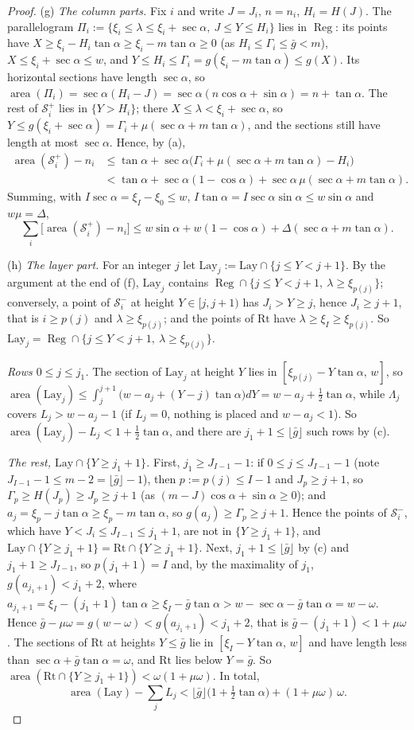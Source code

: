 \documentclass[11pt]{amsart}
\newcommand{\Reg}{\operatorname{Reg}}
\newcommand{\ca}{\cos\alpha}
\newcommand{\sa}{\sin\alpha}
\newcommand{\ta}{\tan\alpha}
\newcommand{\se}{\sec\alpha}
\theoremstyle{definition}
\theoremstyle{remark}
\numberwithin{equation}{section}
\begin{document}
\begin{proof}
(g) \emph{The column parts.} Fix $i$ and write $J=J_i$, $n=n_i$, $H_i=H(J)$. The parallelogram
$\Pi_i:=\{\xi_i\le\lambda\le\xi_i+\se,\ J\le Y\le H_i\}$ lies in $\Reg$: its points have
$X\ge\xi_i-H_i\ta\ge\xi_i-m\ta\ge0$ (as $H_i\le\Gamma_i\le\bar g<m$), $X\le\xi_i+\se\le w$, and
$Y\le H_i\le\Gamma_i=g(\xi_i-m\ta)\le g(X)$. Its horizontal sections have length $\se$, so
$\operatorname{area}(\Pi_i)=\se(H_i-J)=\se(n\ca+\sa)=n+\ta$. The rest of $\mathcal S_i^+$ lies in $\{Y>H_i\}$; there
$X\le\lambda<\xi_i+\se$, so $Y\le g(\xi_i+\se)=\Gamma_i+\mu(\se+m\ta)$, and the sections still have length at most
$\se$. Hence, by (a),
\begin{align*}
\operatorname{area}(\mathcal S_i^+)-n_i&\le\ta+\se\bigl(\Gamma_i+\mu(\se+m\ta)-H_i\bigr)\\
&<\ta+\se(1-\ca)+\se\,\mu(\se+m\ta).
\end{align*}
Summing, with $I\se=\xi_I-\xi_0\le w$, $I\ta=I\se\sa\le w\sa$ and $w\mu=\Delta$,
\[
\sum_i\bigl[\operatorname{area}(\mathcal S_i^+)-n_i\bigr]\le w\sa+w(1-\ca)+\Delta(\se+m\ta).
\]

(h) \emph{The layer part.} For an integer $j$ let $\mathrm{Lay}_j:=\mathrm{Lay}\cap\{j\le Y<j+1\}$. By the argument at the
end of (f), $\mathrm{Lay}_j$ contains $\Reg\cap\{j\le Y<j+1,\ \lambda\ge\xi_{p(j)}\}$; conversely, a point of
$\mathcal S_i^-$ at height $Y\in[j,j+1)$ has $J_i>Y\ge j$, hence $J_i\ge j+1$, that is $i\ge p(j)$ and
$\lambda\ge\xi_{p(j)}$; and the points of $\mathrm{Rt}$ have $\lambda\ge\xi_I\ge\xi_{p(j)}$. So $\mathrm{Lay}_j=\Reg\cap\{j\le Y<j+1,\ \lambda\ge\xi_{p(j)}\}$.

\emph{Rows $0\le j\le j_1$.} The section of $\mathrm{Lay}_j$ at height $Y$ lies in $[\xi_{p(j)}-Y\ta,\,w]$, so
$\operatorname{area}(\mathrm{Lay}_j)\le\int_j^{j+1}\bigl(w-a_j+(Y-j)\ta\bigr)dY=w-a_j+\frac12\ta$, while $\Lambda_j$
covers $L_j>w-a_j-1$ (if $L_j=0$, nothing is placed and $w-a_j<1$). So
$\operatorname{area}(\mathrm{Lay}_j)-L_j<1+\frac12\ta$, and there are $j_1+1\le\lfloor\bar g\rfloor$ such rows by (c).

\emph{The rest, $\mathrm{Lay}\cap\{Y\ge j_1+1\}$.} First, $j_1\ge J_{I-1}-1$: if $0\le j\le J_{I-1}-1$ (note
$J_{I-1}-1\le m-2=\lfloor\bar g\rfloor-1$), then $p:=p(j)\le I-1$ and $J_p\ge j+1$, so
$\Gamma_p\ge H(J_p)\ge J_p\ge j+1$ (as $(m-J)\ca+\sa\ge0$); and $a_j=\xi_p-j\ta\ge\xi_p-m\ta$, so
$g(a_j)\ge\Gamma_p\ge j+1$. Hence the points of $\mathcal S_i^-$, which have $Y<J_i\le J_{I-1}\le j_1+1$, are not in
$\{Y\ge j_1+1\}$, and $\mathrm{Lay}\cap\{Y\ge j_1+1\}=\mathrm{Rt}\cap\{Y\ge j_1+1\}$. Next, $j_1+1\le\lfloor\bar g\rfloor$
by (c) and $j_1+1\ge J_{I-1}$, so $p(j_1+1)=I$ and, by the maximality of $j_1$, $g(a_{j_1+1})<j_1+2$, where
$a_{j_1+1}=\xi_I-(j_1+1)\ta\ge\xi_I-\bar g\ta>w-\se-\bar g\ta=w-\omega$. Hence
$\bar g-\mu\omega=g(w-\omega)<g(a_{j_1+1})<j_1+2$, that is $\bar g-(j_1+1)<1+\mu\omega$. The sections of $\mathrm{Rt}$
at heights $Y\le\bar g$ lie in $[\xi_I-Y\ta,\,w]$ and have length less than $\se+\bar g\ta=\omega$, and $\mathrm{Rt}$
lies below $Y=\bar g$. So $\operatorname{area}(\mathrm{Rt}\cap\{Y\ge j_1+1\})<\omega(1+\mu\omega)$. In total,
\[
\operatorname{area}(\mathrm{Lay})-\sum_jL_j<\lfloor\bar g\rfloor\bigl(1+\tfrac12\ta\bigr)+(1+\mu\omega)\,\omega .
\]


\end{proof}
\end{document}
